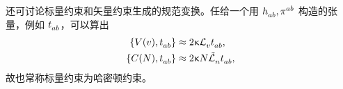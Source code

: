 
		还可讨论标量约束和矢量约束生成的规范变换。任给一个用 $\tensor{h}{_a_b}, \tensor{\pi}{^a^b}$ 构造的张量，例如 $\tensor{t}{_a_b}$，可以算出
		\begin{equation}
			\begin{split}
				\left\{ V(v), \tensor{t}{_a_b} \right\} &\approx 2\gkappa \Ld{v} \tensor{t}{_a_b},\\
				\left\{ C(N) , \tensor{t}{_a_b} \right\} & \approx 2 \gkappa N \spaceLd{n} \tensor{t}{_a_b},
			\end{split}
		\end{equation}
		故也常称标量约束为哈密顿约束。

